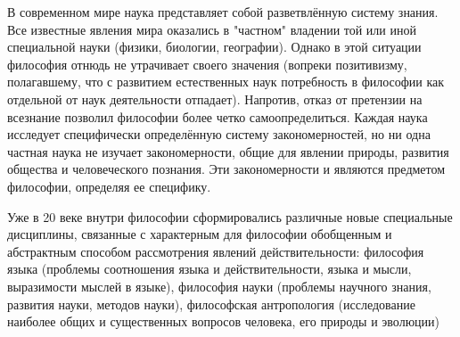\documentclass[a4paper, 12pt]{article}
\theoremstyle{plain} %
\theoremstyle{definition} %
\theoremstyle{remark} %
\begin{document}
\vspace{1em}
В современном мире наука представляет собой разветвлённую систему знания. Все известные явления мира оказались в "частном" владении той или иной специальной науки (физики, биологии, географии). Однако в этой ситуации философия отнюдь не утрачивает своего значения (вопреки позитивизму, полагавшему, что с развитием естественных наук потребность в философии как отдельной от наук деятельности отпадает). Напротив, отказ от претензии на всезнание позволил философии более четко самоопределиться. Каждая наука исследует специфически определённую систему закономерностей, но ни одна частная наука не изучает закономерности, общие для явлении природы, развития общества и человеческого познания. Эти закономерности и являются предметом философии, определяя ее специфику.

\vspace{1em}
Уже в 20 веке внутри философии сформировались различные новые специальные дисциплины, связанные с характерным для философии обобщенным и абстрактным способом рассмотрения явлений действительности: философия языка (проблемы соотношения языка и действительности, языка и мысли, выразимости мыслей в языке), философия науки (проблемы научного знания, развития науки, методов науки), философская антропология (исследование наиболее общих и существенных вопросов человека, его природы и эволюции)
\end{document}
